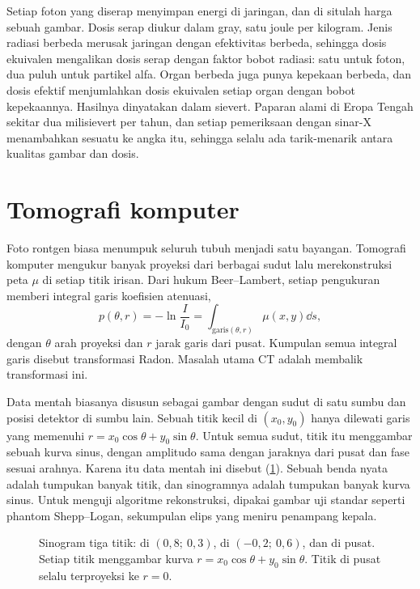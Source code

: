 Setiap foton yang diserap menyimpan energi di jaringan, dan di situlah harga sebuah gambar. Dosis serap diukur
dalam gray, satu joule per kilogram. Jenis radiasi berbeda merusak jaringan dengan efektivitas berbeda, sehingga dosis
ekuivalen mengalikan dosis serap dengan faktor bobot radiasi: satu untuk foton, dua puluh untuk partikel alfa. Organ
berbeda juga punya kepekaan berbeda, dan dosis efektif menjumlahkan dosis ekuivalen setiap organ dengan bobot
kepekaannya. Hasilnya dinyatakan dalam sievert. Paparan alami di Eropa Tengah sekitar dua milisievert per tahun, dan
setiap pemeriksaan dengan sinar-X menambahkan sesuatu ke angka itu, sehingga selalu ada tarik-menarik antara kualitas
gambar dan dosis.

\section{Tomografi komputer}

Foto rontgen biasa menumpuk seluruh tubuh menjadi satu bayangan. Tomografi komputer mengukur banyak proyeksi dari
berbagai sudut lalu merekonstruksi peta $\mu$ di setiap titik irisan. Dari hukum Beer--Lambert, setiap pengukuran
memberi integral garis koefisien atenuasi,
\begin{equation}
p(\theta,r)=-\ln\frac{I}{I_0}=\int_{\text{garis}(\theta,r)}\mu(x,y)\dd s,
\end{equation}
dengan $\theta$ arah proyeksi dan $r$ jarak garis dari pusat. Kumpulan semua integral garis disebut transformasi Radon.
Masalah utama CT adalah membalik transformasi ini.

Data mentah biasanya disusun sebagai gambar dengan sudut di satu sumbu dan posisi detektor di sumbu lain. Sebuah titik
kecil di $(x_0,y_0)$ hanya dilewati garis yang memenuhi $r=x_0\cos\theta+y_0\sin\theta$. Untuk semua sudut, titik itu
menggambar sebuah kurva sinus, dengan amplitudo sama dengan jaraknya dari pusat dan fase sesuai arahnya. Karena itu
data mentah ini disebut  (\cref{fig:sinogram}). Sebuah benda nyata adalah tumpukan banyak titik, dan
sinogramnya adalah tumpukan banyak kurva sinus. Untuk menguji algoritme rekonstruksi, dipakai gambar uji standar
seperti phantom Shepp--Logan, sekumpulan elips yang meniru penampang kepala.

\begin{figure}[ht]
\centering
{}
\caption{Sinogram tiga titik: di $(0{,}8;\ 0{,}3)$, di $(-0{,}2;\ 0{,}6)$, dan di pusat. Setiap titik menggambar kurva
$r=x_0\cos\theta+y_0\sin\theta$. Titik di pusat selalu terproyeksi ke $r=0$.}
\label{fig:sinogram}
\end{figure}


